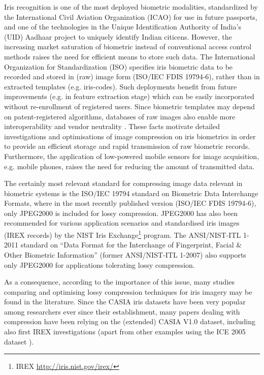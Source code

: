 \documentclass[10pt,twocolumn,letterpaper]{article}
\begin{document}
Iris recognition \cite{BBurge13a,Rathgeb12e} is one of the most deployed biometric
modalities, standardized by the International Civil Aviation
Organization (ICAO) for use in future passports, and one of
the technologies in the Unique Identification Authority of
India's (UID) Aadhaar project to uniquely identify Indian
citicens. However, the increasing market saturation of
biometric instead of conventional access control methods
raises the need for efficient means to store such data. The
International Organization for Standardization (ISO)
specifies iris biometric data to be recorded and stored in (raw)
image form (ISO/IEC FDIS 19794-6), rather than in extracted
templates (e.g. iris-codes). Such
deployments benefit from future improvements (e.g. in
feature extraction stage) which can be easily incorporated
without re-enrollment of registered users. Since biometric templates may depend on patent-registered
algorithms, databases of raw images also enable more
interoperability and vendor neutrality \cite{Rathgeb12e}. These facts
motivate detailed investigations and optimisations of image
compression on iris biometrics in order to provide an efficient
storage and rapid transmission of raw biometric records.
Furthermore, the application of low-powered mobile sensors
for image acquisition, e.g. mobile phones, raises the need for
reducing the amount of transmitted data.

The certainly most relevant standard for compressing
image data relevant in biometric systems is the ISO/IEC
19794 standard on Biometric Data Interchange Formats,
where in the most recently published version (ISO/IEC FDIS
19794-6), only JPEG2000 is included for lossy compression.
JPEG2000 has also been recommended for various
application scenarios and standardised iris images (IREX
records) by the NIST Iris Exchange\footnote{IREX
\url{http://iris.nist.gov/irex/}} program. The ANSI/NIST-ITL
1-2011 standard on ``Data Format for the Interchange of
Fingerprint, Facial \& Other Biometric Information'' (former
ANSI/NIST-ITL 1-2007) also supports only JPEG2000 for
applications tolerating lossy compression.

As a consequence, according to the importance of this issue, many studies comparing and optimising lossy compression techniques for iris imagery 
may be found in the literature. Since the CASIA iris datasets have been very popular among researchers ever since their establishment,
many papers dealing with compression have been relying on the (extended) CASIA V1.0 dataset, including also first IREX investigations 
\cite{BRakshit07a,BIves08a,Matschitsch07a,Haemmerle09a,Konrad09a} (apart from other examples using the ICE 2005 dataset 
\cite{BDaugman08a,BIves10a}).
	
\end{document}
